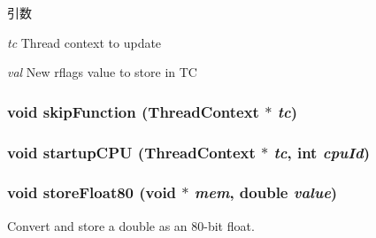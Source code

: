 \begin{DoxyParams}{引数}
\item[{\em tc}]Thread context to update \item[{\em val}]New rflags value to store in TC \end{DoxyParams}
\hypertarget{namespaceX86ISA_a2624d7d8bac3eb03de2eb6e83903c208}{
\subsubsection[{skipFunction}]{\setlength{\rightskip}{0pt plus 5cm}void skipFunction ({\bf ThreadContext} $\ast$ {\em tc})}}
\label{namespaceX86ISA_a2624d7d8bac3eb03de2eb6e83903c208}
\hypertarget{namespaceX86ISA_a343e9193078845bb700799b0c7f24d2a}{
\subsubsection[{startupCPU}]{\setlength{\rightskip}{0pt plus 5cm}void startupCPU ({\bf ThreadContext} $\ast$ {\em tc}, \/  int {\em cpuId})}}
\label{namespaceX86ISA_a343e9193078845bb700799b0c7f24d2a}
\hypertarget{namespaceX86ISA_ae8b48156538261ce17898404db731128}{
\subsubsection[{storeFloat80}]{\setlength{\rightskip}{0pt plus 5cm}void storeFloat80 (void $\ast$ {\em mem}, \/  double {\em value})}}
\label{namespaceX86ISA_ae8b48156538261ce17898404db731128}
Convert and store a double as an 80-\/bit float.


